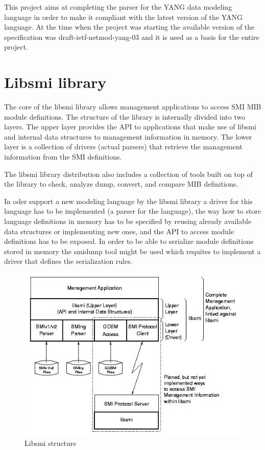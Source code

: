 \documentclass[conference]{IEEEtran}
\begin{document}
This project aims at completing the parser for the YANG data modeling language in order to make it compliant with the latest version of the YANG language. At the time when the project was starting the available version of the specification was draft-ietf-netmod-yang-03 \cite{bib3} and it is used as a basis for the entire project.

\section{Libsmi library}
The core of the libsmi library allows management applications to access SMI MIB module definitions. The structure of the library \cite{bib7} is internally divided into two layers. The upper layer provides the API to applications that make use of libsmi and internal data structures to management information in memory. The lower layer is a collection of drivers (actual parsers) that retrieve the management information from the SMI definitions. 

The libsmi library distribution also includes a collection of tools built on top of the library to check, analyze dump, convert, and compare MIB definitions.

In oder support a new modeling language by the libsmi library a driver for this language has to be implemented (a parser for the language), the way how to store language definitions in memory has to be specified by reusing already available data structures or implementing new ones, and the API to access module definitions has to be exposed. In order to be able to serialize module definitions stored in memory the smidump tool might be used which requites to implement a driver that defines the serialization rules.
\begin{figure}
\begin{center}
\includegraphics[scale=0.50]{libsmi.jpg}
\caption{ Libsmi structure}
\label{fig:libsmi}
\end{center}
\end{figure}
\end{document}
